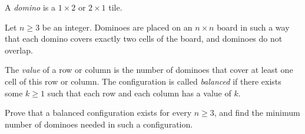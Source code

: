 A \emph{domino} is a $1\times2$ or $2\times1$ tile.

Let $n\geq3$ be an integer. Dominoes are placed on an $n\times n$ board in such a way that each domino covers exactly two cells of the board, and dominoes do not overlap.

The \emph{value} of a row or column is the number of dominoes that cover at least one cell of this row or column. The configuration is called \emph{balanced} if there exists some $k\geq1$ such that each row and each column has a value of $k$.

Prove that a balanced configuration exists for every $n\geq3$, and find the minimum number of dominoes needed in such a configuration.